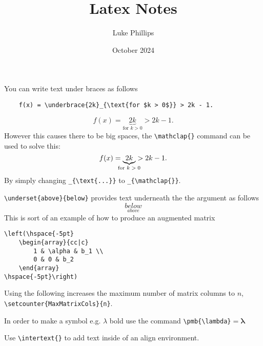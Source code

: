 \documentclass[10pt, a4paper]{article}
\title{Latex Notes}
\author{Luke Phillips}
\date{October 2024}
\begin{document}
\maketitle

\newpage

You can write text under braces as follows
\begin{verbatim}
    f(x) = \underbrace{2k}_{\text{for $k > 0$}} > 2k - 1.
\end{verbatim}
\[
f(x) = \underbrace{2k}_{\text{for $k > 0$}} > 2k - 1.
\]
However this causes there to be big spaces,
the \verb|\mathclap{}| command can be used to solve this:
\[
f(x) = \underbrace{2k}_{\mathclap{\text{for $k > 0$}}} > 2k - 1.
\]
By simply changing \verb|_{\text{...}}| to \verb|_{\mathclap{}}|.

\verb|\underset{above}{below}| provides text underneath the the argument as follows
\[
\underset{above}{below}
\]
This is sort of an example of how to produce an augmented matrix
\begin{verbatim}
\left(\hspace{-5pt}
    \begin{array}{cc|c}
        1 & \alpha & b_1 \\
        0 & 0 & b_2
    \end{array}
\hspace{-5pt}\right)
\end{verbatim}

Using the following increases the maximum number of matrix columns to $n$,
\verb|\setcounter{MaxMatrixCols}{n}|.

In order to make a symbol e.g. $\lambda$ bold use the command \verb|\pmb{\lambda}|$ = \pmb{\lambda}$

Use \verb|\intertext{}| to add text inside of an align environment.
\end{document}
